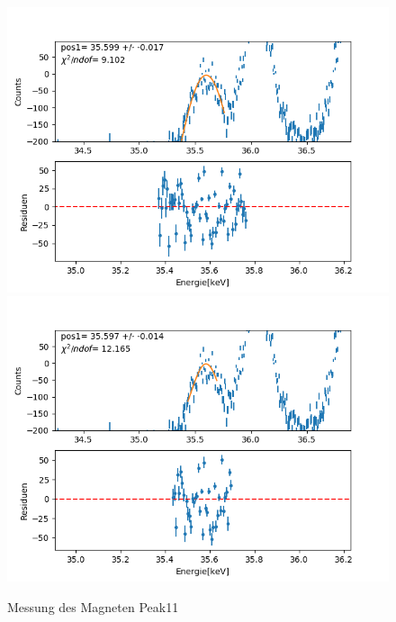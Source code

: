 \documentclass[12pt,a4paper]{article}
\begin{document}
\begin{figure}[H]
\centering
\includegraphics[scale=0.49]{Bilder/roentgen_spektren/magnet/mag11_1.png}
\includegraphics[scale=0.49]{Bilder/roentgen_spektren/magnet/mag11_2.png}
\caption{Messung des Magneten Peak11}
\end{figure}
\end{document}
